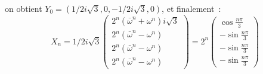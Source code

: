 {\begin{enumerate}
{on obtient $Y_{0}=(1/2i\sqrt{3},0,-1/2i\sqrt{3},0)$, et finalement~:
$$
X_{n}=1/2i\sqrt{3}
\begin{pmatrix}
  2^{n}(\bar\omega^{n}+\omega^{n})i\sqrt{3}\\
  2^{n}(\bar\omega^{n}-\omega^{n})\\
  2^{n}(\bar\omega^{n}-\omega^{n})\\
  2^{n}(\bar\omega^{n}-\omega^{n})
\end{pmatrix}=2^{n}
\begin{pmatrix}
  \cos \frac{n\pi}{3}\\
  -\sin \frac{n\pi}{3}\\
  -\sin \frac{n\pi}{3}\\
  -\sin \frac{n\pi}{3}
\end{pmatrix}
$$}
\end{enumerate}
}
